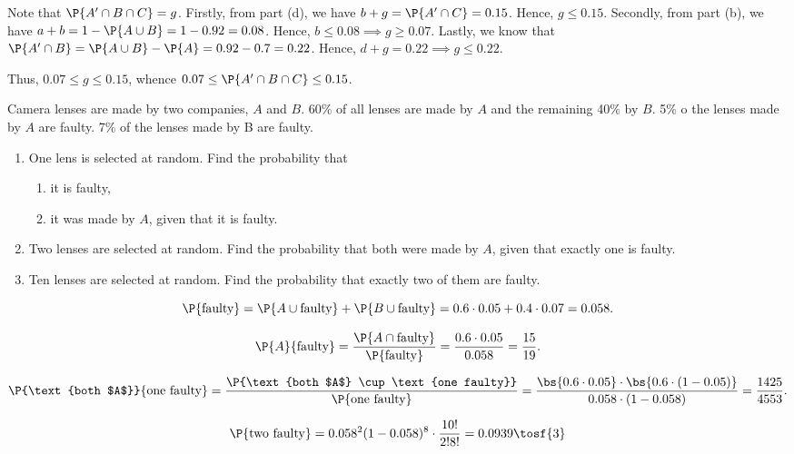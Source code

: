 \begin{solution}
\begin{ppart}
        Note that $\P{A' \cap B \cap C} = g$. Firstly, from part (d), we have $b + g = \P{A' \cap C} = 0.15$. Hence, $g \leq 0.15$. Secondly, from part (b), we have $a + b = 1 - \P{A \cup B} = 1 - 0.92 = 0.08$. Hence, $b \leq 0.08 \implies g \geq 0.07$. Lastly, we know that $\P{A' \cap B} = \P{A \cup B} - \P{A} = 0.92 - 0.7 = 0.22$. Hence, $d + g = 0.22 \implies g \leq 0.22$.

        Thus, $0.07 \leq g \leq 0.15$, whence $0.07 \leq \P{A' \cap B \cap C} \leq 0.15$.
    \end{ppart}
\end{solution}

\begin{problem}
    Camera lenses are made by two companies, $A$ and $B$. 60\% of all lenses are made by $A$ and the remaining 40\% by $B$. 5\% o the lenses made by $A$ are faulty. 7\% of the lenses made by B are faulty.
    \begin{enumerate}
        \item One lens is selected at random. Find the probability that
        \begin{enumerate}
            \item it is faulty,
            \item it was made by $A$, given that it is faulty.
        \end{enumerate}
        \item Two lenses are selected at random. Find the probability that both were made by $A$, given that exactly one is faulty.
        \item Ten lenses are selected at random. Find the probability that exactly two of them are faulty.
    \end{enumerate}
\end{problem}
\begin{solution}
    \begin{ppart}
        \begin{psubpart}
            \[\P{\text{faulty}} = \P{A \cup \text{faulty}} + \P{B \cup \text{faulty}} = 0.6 \cdot 0.05 + 0.4 \cdot 0.07 = 0.058.\]
        \end{psubpart}
        \begin{psubpart}
            \[\P{A}{\text{faulty}} = \frac{\P{A \cap \text{faulty}}}{\P{\text{faulty}}} = \frac{0.6 \cdot 0.05}{0.058} = \frac{15}{19}.\]
        \end{psubpart}
    \end{ppart}
    \begin{ppart}
        \[\P{\text{both $A$}}{\text{one faulty}} = \frac{\P{\text{both $A$} \cup \text{one faulty}}}{\P{\text{one faulty}}} = \frac{\bs{0.6 \cdot 0.05} \cdot \bs{0.6 \cdot (1 - 0.05)}}{0.058 \cdot (1 - 0.058)} = \frac{1425}{4553}.\]
    \end{ppart}
    \begin{ppart}
        \[\P{\text{two faulty}} = 0.058^2 (1 - 0.058)^8 \cdot \frac{10!}{2! 8!} = 0.0939 \tosf{3}\]
    \end{ppart}
\end{solution}

